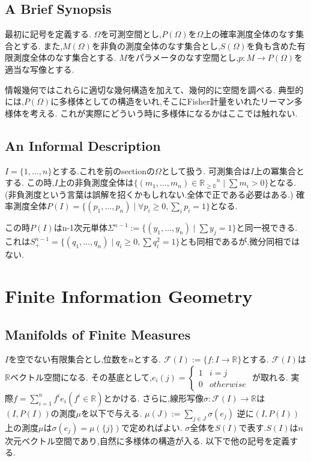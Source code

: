 \documentclass[dvipdfmx]{jarticle}
\begin{document}
\subsection{A Brief Synopsis}
最初に記号を定義する.
$\Omega$を可測空間とし,$P(\Omega)$を$\Omega$上の確率測度全体のなす集合とする.
また,$M(\Omega)$を非負の測度全体のなす集合とし,$S(\Omega)$を負も含めた有限測度全体のなす集合とする.
$M$をパラメータのなす空間とし,$p:M \to P(\Omega)$を適当な写像とする.

情報幾何ではこれらに適切な幾何構造を加えて、幾何的に空間を調べる.
典型的には,$P(\Omega)$に多様体としての構造をいれ,そこにFisher計量をいれたリーマン多様体を考える.
これが実際にどういう時に多様体になるかはここでは触れない.


\subsection{An Informal Description}
$I=\{1, \ldots, n\}$とする.これを前のsectionの$\Omega$として扱う.
可測集合は$I$上の冪集合とする.
この時,$I$上の非負測度全体は$\{(m_1, \ldots, m_n) \in \mathbb{R_{\ge 0}}^n \mid \sum m_i > 0\}$となる.
(非負測度という言葉は誤解を招くかもしれない.全体で正である必要はある.)
確率測度全体$P(I)=\{(p_1, \ldots, p_n) \mid  \forall p_i \ge 0, \sum_i p_i = 1\}$となる.

この時$P(I)$はn-1次元単体$\Sigma^{n-1}:=\{(y_1, \ldots, y_n)\mid \sum y_j = 1\}$と同一視できる.
これは$S^{n-1}_{+}=\{(q_1, \ldots, q_n) \mid q_i \ge 0, \sum q_i^2 = 1\}$とも同相であるが,微分同相ではない.

\section{Finite Information Geometry}
\subsection{Manifolds of Finite Measures}
$I$を空でない有限集合とし,位数を$n$とする.
$\mathcal{F}(I):=\{f:I \to \mathbb{R}\}$とする.
$\mathcal{F}(I)$は$\mathbb{R}$ベクトル空間になる.
その基底として,$e_i(j) = \left\{
\begin{array}{ll}
1 & i = j \\
0 & otherwise
\end{array}
\right.$
が取れる.
実際$f = \sum_{i=1}^n f^i e_i(f^i \in \mathbb{R})$とかける.
さらに,線形写像$\sigma: \mathcal{F}(I) \to \mathbb{R}$は
$(I, P(I))$の測度$\mu$を以下で与える.
$\mu(J) := \sum_{j \in J} \sigma(e_j)$
逆に$(I, P(I))$上の測度$\mu$は$\sigma(e_j) = \mu(\{j\})$で定めればよい.
$\sigma$全体を$S(I)$で表す.$S(I)$は$n$次元ベクトル空間であり,自然に多様体の構造が入る.
以下で他の記号を定義する.
\end{document}

